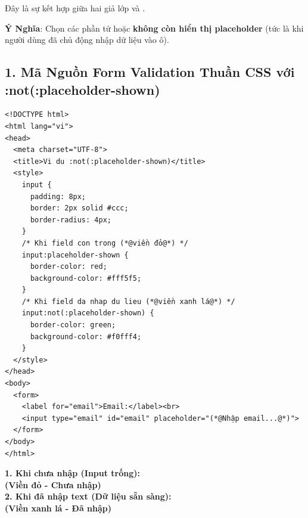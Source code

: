 \begin{conceptBox}
Đây là sự kết hợp giữa hai giả lớp  và .
\par\vspace{4pt}
\textbf{ Ý Nghĩa}: Chọn các phần tử  hoặc  \textbf{không còn hiển thị placeholder} (tức là khi người dùng đã chủ động nhập dữ liệu vào ô).
\end{conceptBox}

\subsection{1. Mã Nguồn Form Validation Thuần CSS với :not(:placeholder-shown)}

\begin{codeWindow}
\begin{lstlisting}[language=HTML5]
<!DOCTYPE html>
<html lang="vi">
<head>
  <meta charset="UTF-8">
  <title>Vi du :not(:placeholder-shown)</title>
  <style>
    input {
      padding: 8px;
      border: 2px solid #ccc;
      border-radius: 4px;
    }
    /* Khi field con trong (*@viền đỏ@*) */
    input:placeholder-shown {
      border-color: red;
      background-color: #fff5f5;
    }
    /* Khi field da nhap du lieu (*@viền xanh lá@*) */
    input:not(:placeholder-shown) {
      border-color: green;
      background-color: #f0fff4;
    }
  </style>
</head>
<body>
  <form>
    <label for="email">Email:</label><br>
    <input type="email" id="email" placeholder="(*@Nhập email...@*)">
  </form>
</body>
</html>
\end{lstlisting}
\end{codeWindow}

\begin{browserWindow}
\sffamily\small
\textbf{1. Khi chưa nhập (Input trống):}\\[2pt]
 \quad \textcolor{red!70!black}{\bfseries (Viền đỏ - Chưa nhập)}\\[8pt]
\textbf{2. Khi đã nhập text (Dữ liệu sẵn sàng):}\\[2pt]
 \quad \textcolor{green!60!black}{\bfseries (Viền xanh lá - Đã nhập)}
\end{browserWindow}

